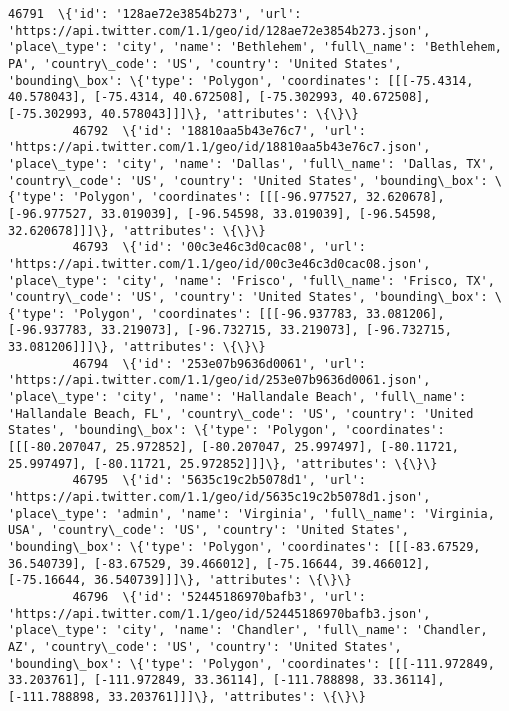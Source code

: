 \documentclass[11pt]{article}
\begin{document}
\begin{Verbatim}[commandchars=\\\{\}]
         46791  \{'id': '128ae72e3854b273', 'url': 'https://api.twitter.com/1.1/geo/id/128ae72e3854b273.json', 'place\_type': 'city', 'name': 'Bethlehem', 'full\_name': 'Bethlehem, PA', 'country\_code': 'US', 'country': 'United States', 'bounding\_box': \{'type': 'Polygon', 'coordinates': [[[-75.4314, 40.578043], [-75.4314, 40.672508], [-75.302993, 40.672508], [-75.302993, 40.578043]]]\}, 'attributes': \{\}\}                         
         46792  \{'id': '18810aa5b43e76c7', 'url': 'https://api.twitter.com/1.1/geo/id/18810aa5b43e76c7.json', 'place\_type': 'city', 'name': 'Dallas', 'full\_name': 'Dallas, TX', 'country\_code': 'US', 'country': 'United States', 'bounding\_box': \{'type': 'Polygon', 'coordinates': [[[-96.977527, 32.620678], [-96.977527, 33.019039], [-96.54598, 33.019039], [-96.54598, 32.620678]]]\}, 'attributes': \{\}\}                             
         46793  \{'id': '00c3e46c3d0cac08', 'url': 'https://api.twitter.com/1.1/geo/id/00c3e46c3d0cac08.json', 'place\_type': 'city', 'name': 'Frisco', 'full\_name': 'Frisco, TX', 'country\_code': 'US', 'country': 'United States', 'bounding\_box': \{'type': 'Polygon', 'coordinates': [[[-96.937783, 33.081206], [-96.937783, 33.219073], [-96.732715, 33.219073], [-96.732715, 33.081206]]]\}, 'attributes': \{\}\}                           
         46794  \{'id': '253e07b9636d0061', 'url': 'https://api.twitter.com/1.1/geo/id/253e07b9636d0061.json', 'place\_type': 'city', 'name': 'Hallandale Beach', 'full\_name': 'Hallandale Beach, FL', 'country\_code': 'US', 'country': 'United States', 'bounding\_box': \{'type': 'Polygon', 'coordinates': [[[-80.207047, 25.972852], [-80.207047, 25.997497], [-80.11721, 25.997497], [-80.11721, 25.972852]]]\}, 'attributes': \{\}\}         
         46795  \{'id': '5635c19c2b5078d1', 'url': 'https://api.twitter.com/1.1/geo/id/5635c19c2b5078d1.json', 'place\_type': 'admin', 'name': 'Virginia', 'full\_name': 'Virginia, USA', 'country\_code': 'US', 'country': 'United States', 'bounding\_box': \{'type': 'Polygon', 'coordinates': [[[-83.67529, 36.540739], [-83.67529, 39.466012], [-75.16644, 39.466012], [-75.16644, 36.540739]]]\}, 'attributes': \{\}\}                         
         46796  \{'id': '52445186970bafb3', 'url': 'https://api.twitter.com/1.1/geo/id/52445186970bafb3.json', 'place\_type': 'city', 'name': 'Chandler', 'full\_name': 'Chandler, AZ', 'country\_code': 'US', 'country': 'United States', 'bounding\_box': \{'type': 'Polygon', 'coordinates': [[[-111.972849, 33.203761], [-111.972849, 33.36114], [-111.788898, 33.36114], [-111.788898, 33.203761]]]\}, 'attributes': \{\}\}                     

\end{Verbatim}
\end{document}
